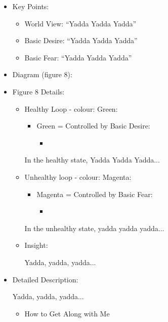 \documentclass[openleft,oneside,showtrims]{memoir}
\begin{document}
\begin{itemize}
\item Key Points:
\label{sec:org50ae798}
\begin{itemize}
\item World View: ``Yadda Yadda Yadda''
\item Basic Desire: ``Yadda Yadda Yadda''
\item Basic Fear: ``Yadda Yadda Yadda''
\end{itemize}

\item Diagram (figure 8):
\label{sec:org831d1a8}

\item Figure 8 Details:
\label{sec:org730c225}

\begin{itemize}
\item Healthy Loop - colour: Green:
\label{sec:org3539e1c}

\begin{itemize}
\item Green = Controlled by Basic Desire:
\begin{itemize}
\item 
\end{itemize}
\end{itemize}

In the healthy state, Yadda Yadda Yadda...

\item Unhealthy loop - colour: Magenta:
\label{sec:orgb1bcf71}

\begin{itemize}
\item Magenta = Controlled by Basic Fear:

\begin{itemize}
\item 
\end{itemize}
\end{itemize}

In the unhealthy state, yadda yadda yadda...

\item Insight:
\label{sec:org4ec16f4}

Yadda, yadda, yadda...
\end{itemize}

\item Detailed Description:
\label{sec:org7b65c90}

Yadda, yadda, yadda...

\begin{itemize}
\item How to Get Along with Me
\label{sec:orga25f8f4}


\end{itemize}
\end{itemize}
\end{document}
